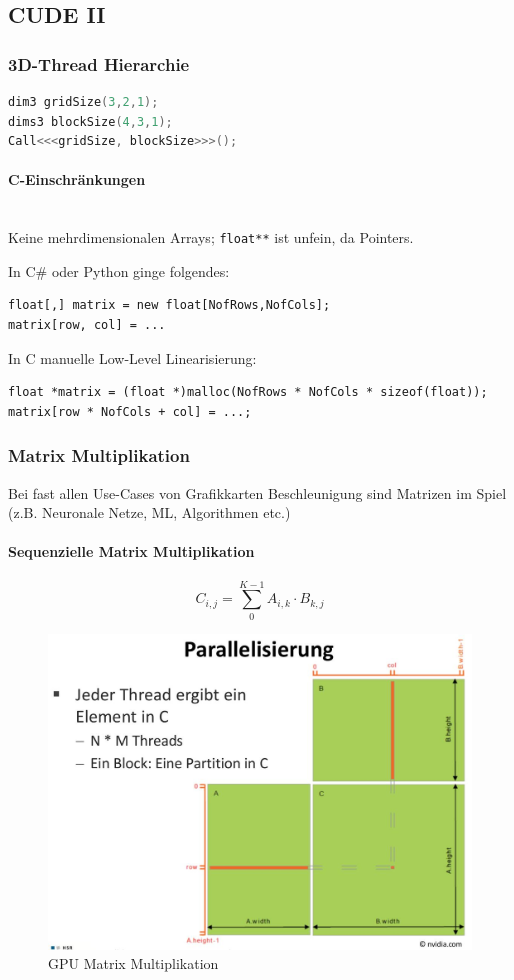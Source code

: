 \subsection{CUDE II}

\subsubsection{3D-Thread Hierarchie}

\begin{lstlisting}[language=C++]
dim3 gridSize(3,2,1);
dims3 blockSize(4,3,1);
Call<<<gridSize, blockSize>>>();
\end{lstlisting}


\paragraph{C-Einschränkungen} \hfill \\

Keine mehrdimensionalen Arrays; \lstinline|float**| ist unfein, da Pointers.

In C\# oder Python ginge folgendes:
\begin{lstlisting}
float[,] matrix = new float[NofRows,NofCols];
matrix[row, col] = ...
\end{lstlisting}

In C manuelle Low-Level Linearisierung:
\begin{lstlisting}
float *matrix = (float *)malloc(NofRows * NofCols * sizeof(float));
matrix[row * NofCols + col] = ...;
\end{lstlisting}

\subsubsection{Matrix Multiplikation}
Bei fast allen Use-Cases von Grafikkarten Beschleunigung sind Matrizen im Spiel (z.B. Neuronale Netze, ML, Algorithmen etc.)

\paragraph{Sequenzielle Matrix Multiplikation}

\[
  C_{i,j} = \sum\limits^{K-1}_{0}{A_{i,k} \cdot B_{k,j}}
\]

\begin{figure}[h]
	\centering
	\includegraphics[width=0.7\linewidth]{img/gpu_matrix_multiplikation}
	\caption{GPU Matrix Multiplikation}
	\label{fig:gpumatrixmultiplikation}
\end{figure}


